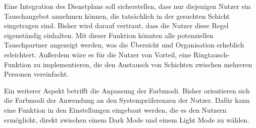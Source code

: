 Eine Integration des Dienstplans soll sicherstellen, dass nur diejenigen Nutzer ein Tauschangebot annehmen können, die tatsächlich in der gesuchten Schicht eingetragen sind. Bisher wird darauf vertraut, dass die Nutzer diese Regel eigenständig einhalten. Mit dieser Funktion könnten alle potenziellen Tauschpartner angezeigt werden, was die Übersicht und Organisation erheblich erleichtert. Außerdem wäre es für die Nutzer von Vorteil, eine Ringtausch-Funktion zu implementieren, die den Austausch von Schichten zwischen mehreren Personen vereinfacht.

Ein weiterer Aspekt betrifft die Anpassung der Farbmodi. Bisher orientieren sich die Farbmodi der Anwendung an den Systempräferenzen der Nutzer. Dafür kann eine Funktion in den Einstellungen eingebaut werden, die es den Nutzern ermöglicht, direkt zwischen einem Dark Mode und einem Light Mode zu wählen.